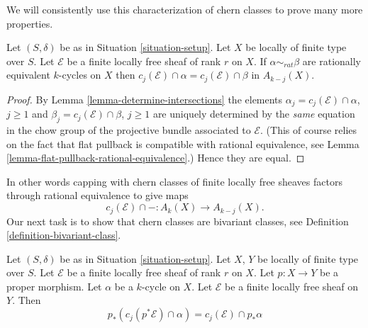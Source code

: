 \noindent
We will consistently use this characterization of chern classes
to prove many more properties.

\begin{lemma}
\label{lemma-cap-chern-class-factors-rational-equivalence}
Let $(S, \delta)$ be as in Situation \ref{situation-setup}.
Let $X$ be locally of finite type over $S$.
Let $\mathcal{E}$ be a finite locally free sheaf of rank $r$ on $X$.
If $\alpha \sim_{rat} \beta$ are rationally equivalent $k$-cycles
on $X$ then $c_j(\mathcal{E}) \cap \alpha = c_j(\mathcal{E}) \cap \beta$
in $A_{k - j}(X)$.
\end{lemma}

\begin{proof}
By Lemma \ref{lemma-determine-intersections} the elements
$\alpha_j = c_j(\mathcal{E}) \cap \alpha$, $j \geq 1$ and
$\beta_j = c_j(\mathcal{E}) \cap \beta$, $j \geq 1$ are uniquely determined
by the {\it same} equation in the chow group of the projective
bundle associated to $\mathcal{E}$. (This of course relies on the fact that
flat pullback is compatible with rational equivalence, see
Lemma \ref{lemma-flat-pullback-rational-equivalence}.) Hence they are equal.
\end{proof}

\noindent
In other words capping with chern classes of
finite locally free sheaves factors through rational equivalence
to give maps
$$
c_j(\mathcal{E}) \cap - : A_k(X) \to A_{k - j}(X).
$$
Our next task is to show that chern classes are bivariant classes, see
Definition \ref{definition-bivariant-class}.

\begin{lemma}
\label{lemma-pushforward-cap-cj}
Let $(S, \delta)$ be as in Situation \ref{situation-setup}.
Let $X$, $Y$ be locally of finite type over $S$.
Let $\mathcal{E}$ be a finite locally free sheaf of rank $r$ on $X$.
Let $p : X \to Y$ be a proper morphism.
Let $\alpha$ be a $k$-cycle on $X$.
Let $\mathcal{E}$ be a finite locally free sheaf on $Y$.
Then
$$
p_*(c_j(p^*\mathcal{E}) \cap \alpha) = c_j(\mathcal{E}) \cap p_*\alpha
$$
\end{lemma}


